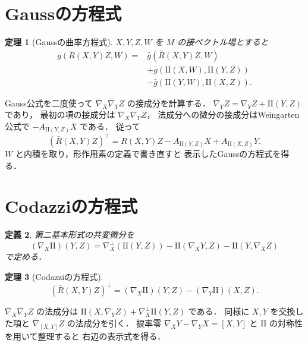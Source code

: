 \documentclass[a5paper,10pt,onecolumn]{jsarticle}
\makeatletter
\theoremstyle{mathnotetheorem}
\newtheorem{theorem}{定理}[section]
\newtheorem{definition}[theorem]{定義}
\renewcommand{\proofname}{証明}
\renewenvironment{proof}[1][\proofname]{%
  \par\pushQED{\qed}\normalfont\topsep4\p@\@plus2\p@\relax
  \trivlist\item[\hskip\labelsep\bfseries #1]\ignorespaces
}{\popQED\endtrivlist\@endpefalse}
\makeatother
\begin{document}
\section{Gaussの方程式}
\begin{theorem}[Gaussの曲率方程式]\label{thm:gausseq}
$X,Y,Z,W$ を $M$ の接ベクトル場とすると
\[
 \begin{aligned}
 g(R(X,Y)Z,W)
 ={}&\bar g(\bar R(X,Y)Z,W)\\
 &+\bar g(\mathrm{II}(X,W),\mathrm{II}(Y,Z))\\
 &-\bar g(\mathrm{II}(Y,W),\mathrm{II}(X,Z)).
 \end{aligned}
\]
\end{theorem}
\begin{proof}
Gauss公式を二度使って
$\bar\nabla_X\bar\nabla_YZ$ の接成分を計算する．
$\bar\nabla_YZ=\nabla_YZ+\mathrm{II}(Y,Z)$ であり，
最初の項の接成分は $\nabla_X\nabla_YZ$，
法成分への微分の接成分はWeingarten公式で
$-A_{\mathrm{II}(Y,Z)}X$ である．
従って
\[
 (\bar R(X,Y)Z)^\top
 =R(X,Y)Z-A_{\mathrm{II}(Y,Z)}X
 +A_{\mathrm{II}(X,Z)}Y.
\]
$W$ と内積を取り，形作用素の定義で書き直すと
表示したGaussの方程式を得る．
\end{proof}
\section{Codazziの方程式}
\begin{definition}
第二基本形式の共変微分を
\[
 (\nabla_X\mathrm{II})(Y,Z)
 =\nabla_X^\perp(\mathrm{II}(Y,Z))
 -\mathrm{II}(\nabla_XY,Z)
 -\mathrm{II}(Y,\nabla_XZ)
\]
で定める．
\end{definition}
\begin{theorem}[Codazziの方程式]\label{thm:codazzi}
\[
 (\bar R(X,Y)Z)^\perp
 =(\nabla_X\mathrm{II})(Y,Z)
 -(\nabla_Y\mathrm{II})(X,Z).
\]
\end{theorem}
\begin{proof}
$\bar\nabla_X\bar\nabla_YZ$ の法成分は
$\mathrm{II}(X,\nabla_YZ)
 +\nabla_X^\perp\mathrm{II}(Y,Z)$ である．
同様に $X,Y$ を交換した項と
$\bar\nabla_{[X,Y]}Z$ の法成分を引く．
捩率零
$\nabla_XY-\nabla_YX=[X,Y]$ と
$\mathrm{II}$ の対称性を用いて整理すると
右辺の表示式を得る．
\end{proof}
\end{document}

